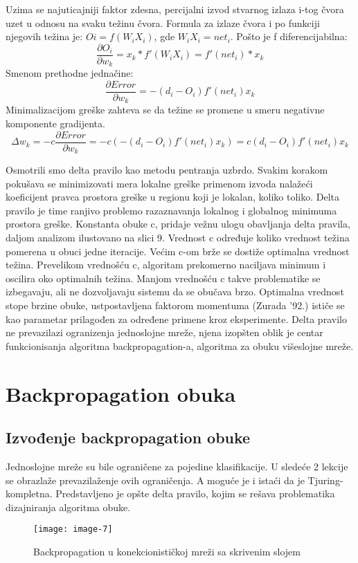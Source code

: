 \documentclass[fontsize=11bp, paper=a4]{scrarticle}
\begin{document}
Uzima se najuticajniji faktor zdesna, percijalni izvod stvarnog izlaza i-tog čvora uzet u odnosu na svaku težinu čvora. Formula za izlaze čvora i po funkciji njegovih težina je:
$Oi = f(W_iX_i)$, gde $W_iX_i = net_i$.
Pošto je f diferencijabilna:
$$
\frac{\partial O_i}{\partial w_k} = x_k * f'(W_iX_i) = f'(net_i)*x_k
$$
Smenom prethodne jednačine:
$$
\frac{\partial Error}{\partial w_k} = - (d_i - O_i) f'(net_i)x_k
$$
Minimalizacijom greške zahteva se da težine se promene u smeru negativne komponente gradijenta.
$$\Delta w_k = -c\frac{\partial Error}{\partial w_k} = -c (- (d_i - O_i) f'(net_i)x_k) = c(d_i - O_i)f'(net_i)x_k$$

Osmotrili smo delta pravilo kao metodu pentranja uzbrdo\cite{hillclimbing}. Svakim korakom pokušava se minimizovati mera lokalne greške primenom izvoda nalažeći koeficijent pravca prostora greške u regionu koji je lokalan, koliko toliko. Delta pravilo je time ranjivo problemo razaznavanja lokalnog i globalnog minimuma prostora greške. Konstanta obuke c, pridaje vežnu ulogu obavljanja delta pravila, daljom analizom ilustovano na slici 9. Vrednost c određuje koliko vrednost težina pomerena u obuci jedne iteracije. Većim c-om brže se dostiže optimalna vrednost težina. Prevelikom vrednošću c, algoritam prekomerno naciljava minimum i oscilira oko optimalnih težina. Manjom vrednošću c takve problematike se izbegavaju, ali ne dozvoljavaju sistemu da se obučava brzo. Optimalna vrednost stope brzine obuke, ustpostavljena faktorom momentuma (Zurada '92.) ističe se kao parametar prilagođen za određene primene kroz eksperimente. Delta pravilo ne prevazilazi ogranizenja jednoslojne mreže, njena izopšten oblik je centar funkcionisanja algoritma backpropagation-a, algoritma za obuku višeslojne mreže.

\section{Backpropagation obuka}
\subsection{Izvođenje backpropagation obuke}
Jednoslojne mreže su bile ograničene za pojedine klasifikacije. U sledeće 2 lekcije se obrazlaže prevazilaženje ovih ograničenja. A moguće je i istaći da je Tjuring-kompletna. Predstavljeno je opšte delta pravilo, kojim se rešava problematika dizajniranja algoritma obuke.

\begin{figure}[h!]
    \centering
    \texttt{[image: image-7]}
    \caption{Backpropagation u konekcionističkoj mreži sa skrivenim slojem}
\end{figure}
\end{document}
